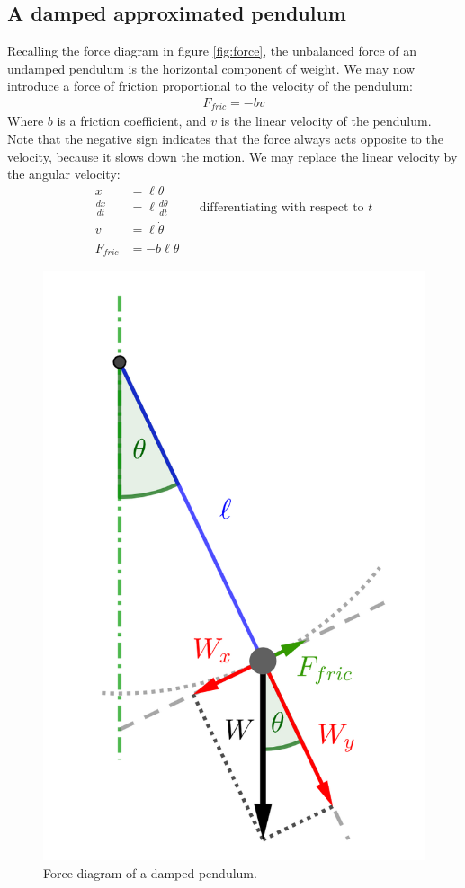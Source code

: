 \documentclass[12pt, a4paper, titlepage]{article}
\theoremstyle{definition}
\numberwithin{equation}{section}
\theoremstyle{definition}
\theoremstyle{definition}
\begin{document}
\subsection{A damped approximated pendulum}
Recalling the force diagram in figure \ref{fig:force}, the unbalanced force of an undamped pendulum is the horizontal component of weight. We may now introduce a force of friction proportional to the velocity of the pendulum: \parencite[pp. 3-4]{damped}
\begin{align}
F_{fric}=-bv
\end{align}
Where $b$ is a friction coefficient, and $v$ is the linear velocity of the pendulum. Note that the negative sign indicates that the force always acts opposite to the velocity, because it slows down the motion. We may replace the linear velocity by the angular velocity:
\begin{align}
x&=\ell\theta\\
\frac{dx}{dt}&=\ell\frac{d\theta}{dt}&&\text{differentiating with respect to $t$}\\
v&=\ell\dot{\theta}\\
F_{fric}&=-b\ell\dot{\theta}
\end{align}
\begin{figure}[H]
    \centering
    \includegraphics[scale=0.8]{force2.png}
    \caption{Force diagram of a damped pendulum.}
    \label{fig:force2}
\end{figure}
\end{document}
